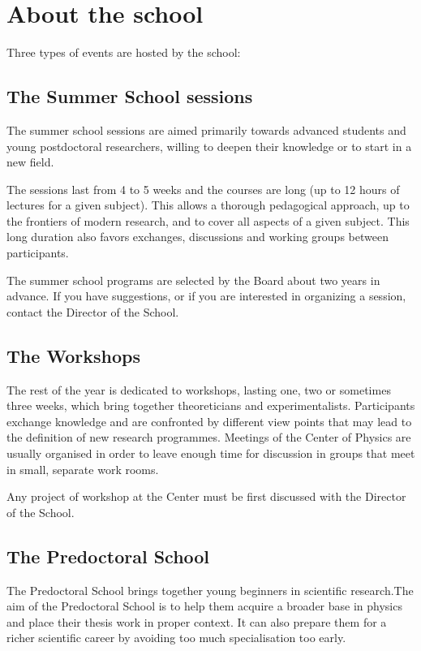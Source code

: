 \newpage

\chapter{About the school}

Three types of events are hosted by the school:

\section{The Summer School sessions}

The summer school sessions are aimed primarily towards advanced students and young postdoctoral researchers, willing to deepen their knowledge or to start in a new field.

The sessions last from 4 to 5 weeks and the courses are long (up to 12 hours of lectures for a given subject). This allows a thorough pedagogical approach, up to the frontiers of modern research, and to cover all aspects of a given subject. This long duration also favors exchanges, discussions and working groups between participants.

The summer school programs are selected by the Board about two years in advance. If you have suggestions, or if you are interested in organizing a session, contact the Director of the School.

\section{The Workshops}

The rest of the year is dedicated to workshops, lasting one, two or sometimes three weeks, which bring together theoreticians and experimentalists. Participants exchange knowledge and are confronted by different view points that may lead to the definition of new research programmes. Meetings of the Center of Physics are usually organised in order to leave enough time for discussion in groups that meet in small, separate work rooms.

Any project of workshop at the Center must be first discussed with the Director of the School.


\section{The Predoctoral School}


The Predoctoral School brings together young beginners in scientific
research.The aim of the Predoctoral School is to help them acquire a
broader base in physics and place their thesis work in proper
context. It can also prepare them for a richer scientific career by
avoiding too much specialisation too early.


